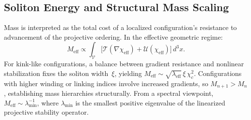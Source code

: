 \subsection{Soliton Energy and Structural Mass Scaling}
  \label{subsec:soliton_energy_mass}

  Mass is interpreted as the total cost of a localized configuration's
  resistance to advancement of the projective ordering.
  In the effective geometric regime:
  \[
    M_{\mathrm{eff}}
    \propto
    \int_{\mathcal{V}}
    \bigl[
      \mathcal{T}(\nabla\chi_{\mathrm{eff}})
      + \mathcal{U}(\chi_{\mathrm{eff}})
      \bigr]\,d^3x.
  \]
  For kink-like configurations, a balance between gradient resistance and
  nonlinear stabilization fixes the soliton width~$\xi$, yielding
  $M_{\mathrm{eff}}
  \sim \sqrt{\lambda_{\mathrm{eff}}}\,\xi\,\chi_c^2$.
  Configurations with higher winding or linking indices involve
  increased gradients, so $M_{n+1} > M_n$, establishing mass hierarchies
  structurally.
  From a spectral viewpoint,
  $M_{\mathrm{eff}} \sim \lambda_{\min}^{-1}$, where
  $\lambda_{\min}$ is the smallest positive eigenvalue of the linearized
  projective stability operator.
